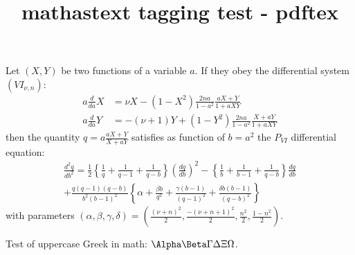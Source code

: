 \documentclass{article}
\title{mathastext tagging test - pdftex}
\begin{document}
Let $(X,Y)$ be two functions of a variable $a$. If they obey  the differential
system  $(VI_{\nu,n})$:
\begin{align*}
a\frac{d}{da} X &= \nu
X - (1 - X^2)\frac{2n a}{1 - a^2}\frac{aX+Y}{1+a XY} \\
a\frac{d}{da} Y &= -(\nu+1) Y
+ (1 - Y^2)\frac{2n a}{1 - a^2}\frac{X+aY}{1+a XY}
\end{align*}
then the quantity $q = a \frac{aX+Y}{X+aY}$
satisfies as function of $b= a^2$  the $P_{VI}$ differential equation:
\begin{equation*}
\begin{split}
\frac{d^2 q}{db^2} = \frac12\left\{\frac1q+\frac1{q-1}
+\frac1{q-b}\right\}\left(\frac{dq}{db}\right)^2 - \left\{\frac1b+\frac1{b-1}
+\frac1{q-b}\right\}\frac{dq}{db}\\+\frac{q(q-1)(q-b)}{b^2(b-1)^2}\left\{\alpha+\frac{\beta
b}{q^2} + \frac{\gamma (b-1)}{(q-1)^2}+\frac{\delta
b(b-1)}{(q-b)^2}\right\}
\end{split}
\end{equation*}
with
parameters
$(\alpha,\beta,\gamma,\delta) = (\frac{(\nu+n)^2}2,
\frac{-(\nu+n+1)^2}2, \frac{n^2}2, \frac{1 - n^2}2)$.

Test of uppercase Greek in math: $\Alpha\Beta\Gamma\Delta\Xi\Omega$.
\end{document}
